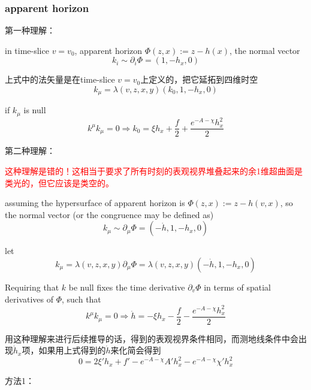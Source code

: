 \documentclass[12pt,a4paper]{ctexart}
\numberwithin{equation}{section}
\begin{document}
\subsubsection{apparent horizon}

第一种理解：

in time-slice $v=v_0$, apparent horizon $\Phi(z,x):=z-h(x)$, the normal vector
\begin{equation}
    k_i\sim\partial_i\Phi=(1,-h_x,0)
\end{equation}

上式中的法矢量是在time-slice $v=v_0$上定义的，把它延拓到四维时空
\begin{equation}
    k_\mu=\lambda(v,z,x,y)(k_0,1,-h_x,0)
\end{equation}

if $k_\mu$ is null
\begin{equation}
    k^\mu k_\mu=0\Rightarrow k_0=\xi h_x + \frac{f}{2} + \frac{e^{- A - \chi} h_x^2}{2}
\end{equation}

第二种理解：

\textcolor{red}{这种理解是错的！这相当于要求了所有时刻的表观视界堆叠起来的余1维超曲面是类光的，但它应该是类空的。}

assuming the hypersurface of apparent horizon is $\Phi(z,x):=z-h(v,x)$, so the normal vector (or the congruence may be defined as)
\begin{equation}
    k_\mu\sim\partial_\mu\Phi=(-\dot{h},1,-h_x,0)
\end{equation}

let
\begin{equation}
    k_\mu=\lambda(v,z,x,y)\partial_\mu\Phi=\lambda(v,z,x,y)(-\dot{h},1,-h_x,0)
\end{equation}

Requiring that $k$ be null fixes the time derivative $\partial_v\Phi$ in terms of spatial derivatives of $\Phi$, such that
\begin{equation}
    k^\mu k_\mu=0\Rightarrow\dot{h}=- \xi h_x - \frac{f}{2} - \frac{e^{- A - \chi} h_x^2}{2}
\end{equation}

用这种理解来进行后续推导的话，得到的表观视界条件相同，而测地线条件中会出现$\dot{h}_x$项，如果用上式得到的$\dot{h}$来化简会得到
\begin{equation}
    0=2 \xi' h_x + f' - e^{-A-\chi} A' h_x^2 - e^{-A-\chi} \chi' h_x^2
\end{equation}

方法1：
\end{document}
